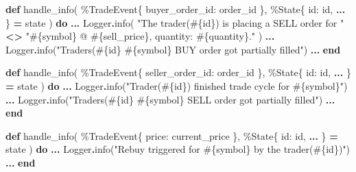 \documentclass[
  oneside]{book}
\newenvironment{Shaded}{\begin{snugshade}}{\end{snugshade}}
\newcommand{\ConstantTok}[1]{\textcolor[rgb]{0.00,0.00,0.00}{#1}}
\newcommand{\KeywordTok}[1]{\textcolor[rgb]{0.13,0.29,0.53}{\textbf{#1}}}
\newcommand{\NormalTok}[1]{#1}
\newcommand{\OperatorTok}[1]{\textcolor[rgb]{0.81,0.36,0.00}{\textbf{#1}}}
\newcommand{\OtherTok}[1]{\textcolor[rgb]{0.56,0.35,0.01}{#1}}
\newcommand{\StringTok}[1]{\textcolor[rgb]{0.31,0.60,0.02}{#1}}
\newcommand{\VariableTok}[1]{\textcolor[rgb]{0.00,0.00,0.00}{#1}}
\begin{document}
\begin{Shaded}
\begin{Highlighting}[]
  \KeywordTok{def}\NormalTok{ handle\_info(}
\NormalTok{        \%}\ConstantTok{TradeEvent}\NormalTok{\{}
          \VariableTok{buyer\_order\_id:}\NormalTok{ order\_id}
\NormalTok{        \},}
\NormalTok{        \%}\ConstantTok{State}\NormalTok{\{}
          \VariableTok{id:}\NormalTok{ id,}
          \OperatorTok{...}
\NormalTok{        \} }\OperatorTok{=}\NormalTok{ state}
\NormalTok{      ) }\KeywordTok{do}
    \OperatorTok{...}
        \ConstantTok{Logger}\OperatorTok{.}\NormalTok{info(}
          \StringTok{"The trader(}\OtherTok{\#\{}\NormalTok{id}\OtherTok{\}}\StringTok{) is placing a SELL order for "} \OperatorTok{\textless{}\textgreater{}}
            \StringTok{"}\OtherTok{\#\{}\NormalTok{symbol}\OtherTok{\}}\StringTok{ @ }\OtherTok{\#\{}\NormalTok{sell\_price}\OtherTok{\}}\StringTok{, quantity: }\OtherTok{\#\{}\NormalTok{quantity}\OtherTok{\}}\StringTok{."}
\NormalTok{        )}
        \OperatorTok{...}
        \ConstantTok{Logger}\OperatorTok{.}\NormalTok{info(}\StringTok{"Trader\textquotesingle{}s(}\OtherTok{\#\{}\NormalTok{id}\OtherTok{\}}\StringTok{ }\OtherTok{\#\{}\NormalTok{symbol}\OtherTok{\}}\StringTok{ BUY order got partially filled"}\NormalTok{)}
        \OperatorTok{...}
  \KeywordTok{end}

  \KeywordTok{def}\NormalTok{ handle\_info(}
\NormalTok{        \%}\ConstantTok{TradeEvent}\NormalTok{\{}
          \VariableTok{seller\_order\_id:}\NormalTok{ order\_id}
\NormalTok{        \},}
\NormalTok{        \%}\ConstantTok{State}\NormalTok{\{}
          \VariableTok{id:}\NormalTok{ id,}
          \OperatorTok{...}
\NormalTok{        \} }\OperatorTok{=}\NormalTok{ state}
\NormalTok{      ) }\KeywordTok{do}
    \OperatorTok{...}
      \ConstantTok{Logger}\OperatorTok{.}\NormalTok{info(}\StringTok{"Trader(}\OtherTok{\#\{}\NormalTok{id}\OtherTok{\}}\StringTok{) finished trade cycle for }\OtherTok{\#\{}\NormalTok{symbol}\OtherTok{\}}\StringTok{"}\NormalTok{)}
      \OperatorTok{...}
      \ConstantTok{Logger}\OperatorTok{.}\NormalTok{info(}\StringTok{"Trader\textquotesingle{}s(}\OtherTok{\#\{}\NormalTok{id}\OtherTok{\}}\StringTok{ }\OtherTok{\#\{}\NormalTok{symbol}\OtherTok{\}}\StringTok{ SELL order got partially filled"}\NormalTok{)      }\OperatorTok{...}
  \KeywordTok{end}

  \KeywordTok{def}\NormalTok{ handle\_info(}
\NormalTok{        \%}\ConstantTok{TradeEvent}\NormalTok{\{}
          \VariableTok{price:}\NormalTok{ current\_price}
\NormalTok{        \},}
\NormalTok{        \%}\ConstantTok{State}\NormalTok{\{}
          \VariableTok{id:}\NormalTok{ id,}
          \OperatorTok{...}
\NormalTok{        \} }\OperatorTok{=}\NormalTok{ state}
\NormalTok{      ) }\KeywordTok{do}
      \OperatorTok{...}
      \ConstantTok{Logger}\OperatorTok{.}\NormalTok{info(}\StringTok{"Rebuy triggered for }\OtherTok{\#\{}\NormalTok{symbol}\OtherTok{\}}\StringTok{ by the trader(}\OtherTok{\#\{}\NormalTok{id}\OtherTok{\}}\StringTok{)"}\NormalTok{)}
      \OperatorTok{...}
  \KeywordTok{end}
\end{Highlighting}
\end{Shaded}
\end{document}
